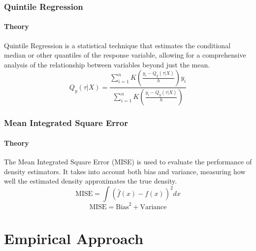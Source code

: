 \documentclass{beamer} %
\theoremstyle{definition}
\begin{document}
	\begin{frame}
		\frametitle{Quintile Regression}
		\framesubtitle{Theory}
		Quintile Regression is a statistical technique that estimates the conditional median or other quantiles of the response variable, allowing for a comprehensive analysis of the relationship between variables beyond just the mean.
		$$
		    Q_y(\tau | X) = \frac{\sum_{i=1}^{n} K\left(\frac{y_i - Q_y(\tau | X)}{h}\right) y_i}{\sum_{i=1}^{n} K\left(\frac{y_i - Q_y(\tau | X)}{h}\right)}
		$$
	\end{frame}
	
	\begin{frame}
		\frametitle{Mean Integrated Square Error}
		\framesubtitle{Theory}
		The Mean Integrated Square Error (MISE) is used to evaluate the performance of density estimators. It takes into account both bias and variance, measuring how well the estimated density approximates the true density.
		$$
		\text{MISE} = \int \left( \hat{f}(x) - f(x) \right)^2 dx
		$$
		$$
		\text{MISE} = \text{Bias}^2 + \text{Variance}
		$$
	\end{frame}
		
	
	\section{Empirical Approach}
\end{document}
